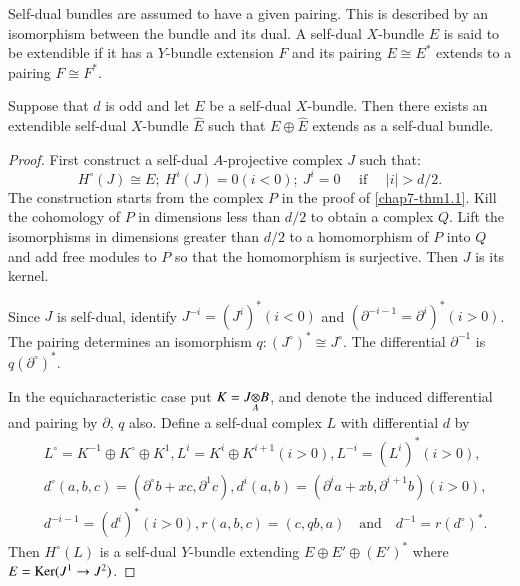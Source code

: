 Self-dual bundles are assumed to have a given pairing. This is
described by an isomorphism between the bundle and its dual. A
self-dual $X$-bundle $E$ is said to be extendible if it has a
$Y$-bundle extension $F$ and its pairing $E\cong E^{*}$ extends to a
pairing $F\cong F^{*}$. 

\begin{theorem}\label{chap7-thm2.1}
Suppose that $d$ is odd and let $E$ be a self-dual $X$-bundle. Then
there exists an extendible self-dual $X$-bundle $\widehat{E}$ such
that $E\oplus \widehat{E}$ extends as a self-dual bundle.
\end{theorem}

\begin{proof}
First construct a self-dual $A$-projective complex $J$ such that:
$$
H^{\circ}(J)\cong E; \ H^{i}(J)=0(i<0); \ J^{i}=0\text{~~~ if~~~ } |i|>d/2.
$$ 
The construction starts from the complex $P$ in the proof
of \ref{chap7-thm1.1}. Kill the cohomology of $P$ in dimensions less
than $d/2$ to obtain a complex $Q$. Lift the isomorphisms in
dimensions greater than $d/2$ to a homomorphism of $P$ into $Q$ and
add free modules to $P$ so that the homomorphism is surjective. Then
$J$ is its kernel.

Since $J$ is self-dual, identify $J^{-i}=(J^{i})^{\ast} (i<0)$ and
$(\partial^{-i-1}=\partial^{i})^{\ast} (i>0)$. The pairing determines an
isomorphism $q:(J^{\circ})^{\ast}\cong J^{\circ}$. The differential
$\partial^{-1}$ is $q(\partial^{\circ})^{*}$.

In the equicharacteristic case put $K=\foprod{J}{B}{A}$, and denote
the induced differential and pairing by $\partial$, $q$ also. Define a
self-dual complex $L$ with differential $d$ by
\begin{align*}
& L^{\circ}=K^{-1}\oplus K^{\circ}\oplus K^{1}, L^{i}=K^{i}\oplus
K^{i+1}(i>0), L^{-i}=(L^{i})^{\ast}(i>0),\\[3pt]
&
d^{\circ}(a,b,c)=(\partial^{\circ}b+xc,\partial^{1}c),d^{i}(a,b)=(\partial^{i}a+xb,\partial^{i+1}b)(i>0),\\[3pt]
& d^{-i-1}=(d^{i})^{\ast}(i>0), r(a,b,c)=(c,qb,a)\text{~~ and~~ }
d^{-1}=r(d^{\circ})^{\ast}. 
\end{align*}
Then $H^{\circ}(L)$ is a self-dual $Y$-bundle extending $E\oplus
E'\oplus (E')^{\ast}$ where $E=\operatorname{Ker} (J^{1}\to J^{2})$. 


\end{proof}
